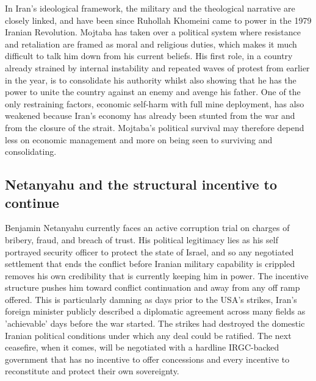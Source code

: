 \documentclass[12pt,a4paper]{article}
\begin{document}
In Iran’s ideological framework, the military and the theological narrative are closely linked, and have been since Ruhollah Khomeini came to power in the 1979 Iranian Revolution. Mojtaba has taken over a political system where resistance and retaliation are framed as moral and religious duties, which makes it much difficult to talk him down from his current beliefs. His first role, in a country already strained by internal instability and repeated waves of protest from earlier in the year, is to consolidate his authority whilst also showing that he has the power to unite the country against an enemy and avenge his father. One of the only restraining factors, economic self-harm with full mine deployment, has also weakened because Iran’s economy has already been stunted from the war and from the closure of the strait. Mojtaba’s political survival may therefore depend less on economic management and more on being seen to surviving and consolidating. 


\subsection{Netanyahu and the structural incentive to continue}
Benjamin Netanyahu currently faces an active corruption trial on charges of bribery, fraud, and breach of trust. His political legitimacy lies as his self portrayed security officer to protect the state of Israel, and so any negotiated settlement that ends the conflict before Iranian military capability is crippled removes his own credibility that is currently keeping him in power. The incentive structure pushes him toward conflict continuation and away from any off ramp offered. This is particularly damning as days prior to the USA's strikes, Iran’s foreign minister publicly described a diplomatic agreement across many fields as 'achievable' days before the war started. The strikes had destroyed the domestic Iranian political conditions under which any deal could be ratified. The next ceasefire, when it comes, will be negotiated with a hardline IRGC-backed government that has no incentive to offer concessions and every incentive to reconstitute and protect their own sovereignty.
\end{document}
